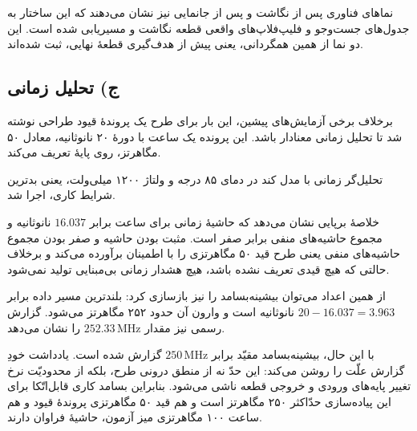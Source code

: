 \documentclass[12pt,a4paper]{article}
\begin{document}
	نماهای فناوری پس از نگاشت و پس از جانمایی نیز نشان می‌دهند که این ساختار به جدول‌های جست‌وجو و فلیپ‌فلاپ‌های واقعی قطعه نگاشت و مسیریابی شده است. این دو نما از همین همگردانی، یعنی پیش از هدف‌گیری قطعهٔ نهایی، ثبت شده‌اند.


	\subsection*{ج) تحلیل زمانی}
	برخلاف برخی آزمایش‌های پیشین، این بار برای طرح یک پروندهٔ قیود طراحی نوشته شد تا تحلیل زمانی معنادار باشد. این پرونده یک ساعت با دورهٔ ۲۰ نانوثانیه، معادل ۵۰ مگاهرتز، روی پایهٔ  تعریف می‌کند.


	تحلیل‌گر زمانی با مدل کند در دمای ۸۵ درجه و ولتاژ ۱۲۰۰ میلی‌ولت، یعنی بدترین شرایط کاری، اجرا شد.


	خلاصهٔ برپایی نشان می‌دهد که حاشیهٔ زمانی برای ساعت  برابر \(16.037\) نانوثانیه و مجموع حاشیه‌های منفی برابر صفر است. مثبت بودن حاشیه و صفر بودن مجموع حاشیه‌های منفی یعنی طرح قید ۵۰ مگاهرتزی را با اطمینان برآورده می‌کند و برخلاف حالتی که هیچ قیدی تعریف نشده باشد، هیچ هشدار زمانی بی‌مبنایی تولید نمی‌شود.


	از همین اعداد می‌توان بیشینه‌بسامد را نیز بازسازی کرد: بلندترین مسیر داده برابر \(20-16.037=3.963\) نانوثانیه است و وارون آن حدود ۲۵۲ مگاهرتز می‌شود. گزارش رسمی نیز مقدار \(252.33\,\mathrm{MHz}\) را نشان می‌دهد.


	با این حال، بیشینه‌بسامد مقیّد برابر \(250\,\mathrm{MHz}\) گزارش شده است. یادداشت خودِ گزارش علّت را روشن می‌کند: این حدّ نه از منطق درونی طرح، بلکه از محدودیّت نرخ تغییر پایه‌های ورودی و خروجی قطعه ناشی می‌شود. بنابراین بسامد کاری قابل‌اتّکا برای این پیاده‌سازی حدّاکثر ۲۵۰ مگاهرتز است و هم قید ۵۰ مگاهرتزی پروندهٔ قیود و هم ساعت ۱۰۰ مگاهرتزی میز آزمون، حاشیهٔ فراوان دارند.
\end{document}
